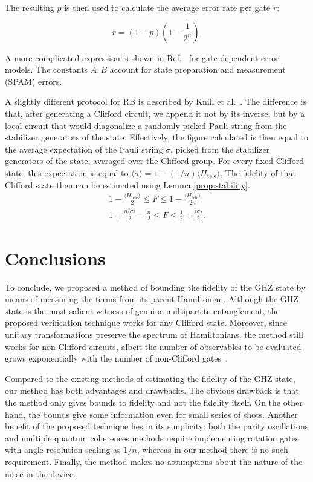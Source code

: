 The resulting $p$ is then used to calculate the average error rate per gate $r$: 

\begin{equation}
    r = (1-p)\left(1 - \frac{1}{2^n}\right).
\end{equation}

A more complicated expression is shown in Ref.~\cite{magesan_robust_2011-1} for gate-dependent error models. The constants $A, B$ account for state preparation and measurement (SPAM) errors.

A slightly different protocol for RB is described by Knill et al.~\cite{knill_randomized_2008}. The difference is that, after generating a Clifford circuit, we append it not by its inverse, but by a local circuit that would diagonalize a randomly picked Pauli string from the stabilizer generators of the state. Effectively, the figure calculated is then equal to the average expectation of the Pauli string $\sigma$, picked from the stabilizer generators of the state, averaged over the Clifford group. For every fixed Clifford state, this expectation is equal to $\langle \sigma \rangle = 1 - (1/n)\langle H_\mathrm{tele} \rangle$. The fidelity of that Clifford state then can be estimated using Lemma \ref{prop:stability}.
\begin{gather}
    1 - \frac{\langle H_\mathrm{tele} \rangle}{2}  \leq F \leq 1 - \frac{\langle H_\mathrm{tele} \rangle}{2n} \\
    1 + \frac{n \langle \sigma \rangle}{2} - \frac{n}{2}  \leq F \leq \frac{1}{2} + \frac{\langle \sigma \rangle}{2}.
\end{gather}

\section{Conclusions}

To conclude, we proposed a method of bounding the fidelity of the GHZ state by means of measuring the terms from its parent Hamiltonian. Although the GHZ state is the most salient witness of genuine multipartite entanglement, the proposed verification technique works for any Clifford state. Moreover, since unitary transformations preserve the spectrum of Hamiltonians, the method still works for non-Clifford circuits, albeit the number of observables to be evaluated grows exponentially with the number of non-Clifford gates~\cite{biamonte_universal_2021}.

Compared to the existing methods of estimating the fidelity of the GHZ state, our method has both advantages and drawbacks. The obvious drawback is that the method only gives bounds to fidelity and not the fidelity itself. On the other hand, the bounds give some information even for small series of shots. Another benefit of the proposed technique lies in its simplicity: both the parity oscillations and multiple quantum coherences methods require implementing rotation gates with angle resolution scaling as $1/n$, whereas in our method there is no such requirement. Finally, the method makes no assumptions about the nature of the noise in the device.